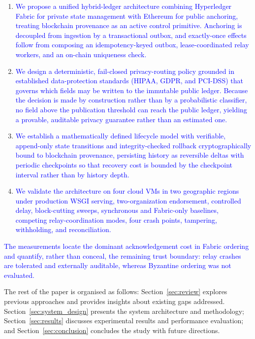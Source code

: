 \documentclass[final,5p,times,twocolumn]{elsarticle}
\begin{document}
\begin{enumerate}
    \item \textcolor{blue}{We propose a unified hybrid-ledger architecture combining Hyperledger Fabric
    for private state management with Ethereum for public anchoring, treating blockchain
    provenance as an active control primitive. Anchoring is decoupled from ingestion by a
    transactional outbox, and exactly-once effects follow from composing an
    idempotency-keyed outbox, lease-coordinated relay workers, and an on-chain uniqueness check.}
    \item \textcolor{blue}{We design a deterministic, fail-closed privacy-routing policy grounded in
    established data-protection standards (HIPAA, GDPR, and PCI-DSS) that governs which
    fields may be written to the immutable public ledger. Because the decision is made by
    construction rather than by a probabilistic classifier, no field above the publication
    threshold can reach the public ledger, yielding a provable, auditable privacy
    guarantee rather than an estimated one.}
    \item \textcolor{blue}{We establish a mathematically defined lifecycle model with verifiable,
    append-only state transitions and integrity-checked rollback cryptographically bound
    to blockchain provenance, persisting history as reversible deltas with periodic
    checkpoints so that recovery cost is bounded by the checkpoint interval rather than by
    history depth.}
    \item \textcolor{blue}{We validate the architecture on four cloud VMs in two geographic regions under production WSGI serving, two-organization endorsement, controlled delay, block-cutting sweeps, synchronous and Fabric-only baselines, competing relay-coordination modes, four crash points, tampering, withholding, and reconciliation.}
\end{enumerate}
\textcolor{blue}{The measurements locate the dominant acknowledgement cost in Fabric ordering and quantify, rather than conceal, the remaining trust boundary: relay crashes are tolerated and externally auditable, whereas Byzantine ordering was not evaluated.}

The rest of the paper is organised as follows: Section~\ref{sec:review} explores previous approaches and provides insights about existing gaps addressed. Section~\ref{sec:system_design} presents the system architecture and methodology; Section~\ref{sec:results} discusses experimental results and performance evaluation; and Section~\ref{sec:conclusion} concludes the study with future directions.
\end{document}
